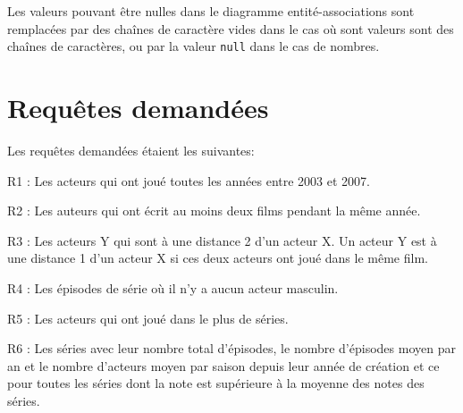 \documentclass[a4paper,12pt]{article}
\begin{document}
Les valeurs pouvant être nulles dans le diagramme entité-associations
sont remplacées par des chaînes de caractère vides dans le cas où sont
valeurs sont des chaînes de caractères, ou par la valeur \texttt{null}
dans le cas de nombres.
\section{Requêtes demandées}
Les requêtes demandées étaient les suivantes:
\begin{list}{-}{}
  \item R1 : Les acteurs qui ont joué toutes les années entre 2003 et
    2007.
  \item R2 : Les auteurs qui ont écrit au moins deux films pendant la
    même année.
  \item R3 : Les acteurs Y qui sont à une distance 2 d'un acteur X. Un
    acteur Y est à une distance 1 d'un acteur X si ces deux acteurs
    ont joué dans le même film.
  \item R4 : Les épisodes de série où il n'y a aucun acteur masculin.
  \item R5 : Les acteurs qui ont joué dans le plus de séries.
  \item R6 : Les séries avec leur nombre total d'épisodes, le nombre
    d'épisodes moyen par an et le nombre d'acteurs moyen par saison
    depuis leur année de création et ce pour toutes les séries dont la
    note est supérieure à la moyenne des notes des séries.
\end{list}
\end{document}
